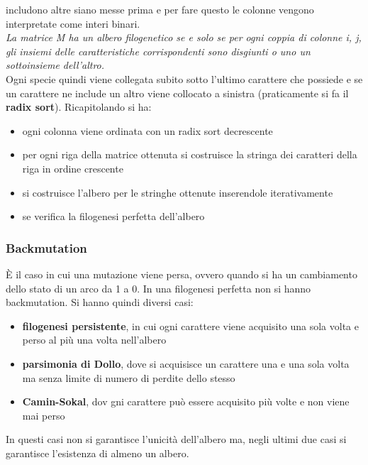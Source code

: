 \documentclass[a4paper,12pt, oneside]{book}
\begin{document}
includono altre siano messe prima e per fare questo le colonne vengono
interpretate come interi binari.
\\
\textit{La matrice M ha un albero filogenetico se e solo se per ogni
  coppia di colonne i, j, gli insiemi delle caratteristiche
  corrispondenti sono disgiunti o uno un sottoinsieme dell’altro.} \\
Ogni specie quindi viene collegata subito sotto l'ultimo carattere
che possiede e se un carattere ne include un altro viene collocato a
sinistra (praticamente si fa il \textbf{radix sort}). Ricapitolando si
ha:
\begin{itemize}
  \item ogni colonna viene ordinata con un radix sort decrescente
  \item per ogni riga della matrice ottenuta si costruisce la stringa
  dei caratteri della riga in ordine crescente
  \item si costruisce l'albero per le stringhe ottenute inserendole
  iterativamente
  \item se verifica la filogenesi perfetta dell'albero
\end{itemize}
\subsubsection{Backmutation}
È il caso in cui una mutazione viene persa, ovvero quando si ha un
cambiamento dello stato di un arco da 1 a 0. In una filogenesi
perfetta non si hanno backmutation. Si hanno quindi diversi casi:
\begin{itemize}
  \item \textbf{filogenesi persistente}, in cui ogni carattere viene
  acquisito una sola volta e perso al più una volta nell’albero
  \item \textbf{parsimonia di Dollo}, dove si acquisisce un carattere
  una e una sola volta ma senza limite di numero di perdite dello
  stesso
  \item \textbf{Camin-Sokal}, dov gni carattere può essere acquisito
  più volte e non viene mai perso 
\end{itemize}
In questi casi non si garantisce l'unicità dell'albero ma, negli
ultimi due casi si garantisce l'esistenza di almeno un albero. 
\end{document}
